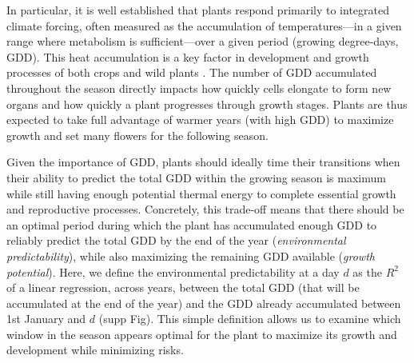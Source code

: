 \documentclass[11pt,letter]{article}
\begin{document}
In particular, it is well established that plants respond primarily to integrated climate forcing, often measured as the accumulation of temperatures---in a given range where metabolism is sufficient---over a given period (growing degree-days, GDD). This heat accumulation is a key factor in development and growth processes of both crops \citep[e.g.][]{Cross1972} and wild plants \citep[e.g.][]{Hunter1992} . The number of GDD accumulated throughout the season directly impacts how quickly cells elongate to form new organs and how quickly a plant progresses through growth stages. Plants are thus expected to take full advantage of warmer years (with high GDD) to maximize growth and set many flowers for the following season.

Given the importance of GDD, plants should ideally time their transitions when their ability to predict the total GDD within the growing season is maximum while still having enough potential thermal energy to complete essential growth and reproductive processes. Concretely, this trade-off means that there should be an optimal period during which the plant has accumulated enough GDD to reliably predict the total GDD by the end of the year (\emph{environmental predictability}), while also maximizing the remaining GDD available (\emph{growth potential}). Here, we define the environmental predictability at a day $d$ as the $R^2$ of a linear regression, across years, between the total GDD (that will be accumulated at the end of the year) and the GDD already accumulated between 1st January and $d$ (supp Fig). 
This simple definition allows us to examine which window in the season appears optimal for the plant to maximize its growth and development while minimizing risks.
\end{document}
